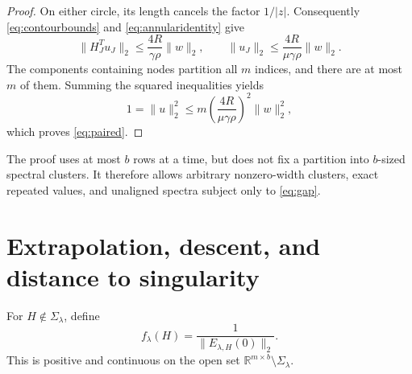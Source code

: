 \documentclass[11pt]{article}
\numberwithin{equation}{section}
\theoremstyle{definition}
\newcommand{\R}{\mathbb R}
\newcommand{\nn}[1]{\lVert #1\rVert}
\begin{document}
\begin{proof}
On either circle, its length cancels the factor $1/|z|$. Consequently \eqref{eq:contourbounds} and \eqref{eq:annularidentity} give
\[
\nn{H_J^Tu_J}_2\le\frac{4R}{\gamma\rho}\nn w_2,
\qquad
\nn{u_J}_2\le\frac{4R}{\mu\gamma\rho}\nn w_2.
\]
The components containing nodes partition all $m$ indices, and there are at most $m$ of them. Summing the squared inequalities yields
\[
1=\nn u_2^2\le m\left(\frac{4R}{\mu\gamma\rho}\right)^2\nn w_2^2,
\]
which proves \eqref{eq:paired}.
\end{proof}

The proof uses at most $b$ rows at a time, but does not fix a partition into $b$-sized spectral clusters. It therefore allows arbitrary nonzero-width clusters, exact repeated values, and unaligned spectra subject only to \eqref{eq:gap}.

\section{Extrapolation, descent, and distance to singularity}\label{sec:descent}
For $H\notin\Sigma_\lambda$, define
\begin{equation}\label{eq:f}
f_\lambda(H)=\frac1{\nn{E_{\lambda,H}(0)}_2}.
\end{equation}
This is positive and continuous on the open set $\R^{m\times b}\setminus\Sigma_\lambda$.
\end{document}
